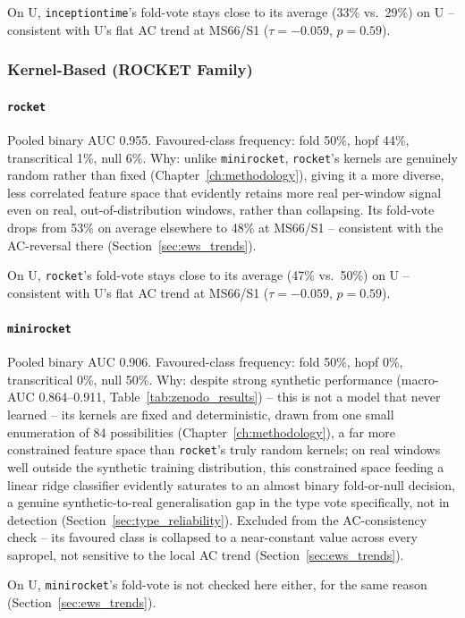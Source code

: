 On U, \texttt{inceptiontime}'s fold-vote stays close to its average (33\% vs.\ 29\%) on U -- consistent with U's flat AC trend at MS66/S1 ($\tau=-0.059$, $p=0.59$).

\subsubsection{Kernel-Based (ROCKET Family)}
\paragraph{\texttt{rocket}} Pooled binary AUC 0.955. Favoured-class frequency: fold 50\%, hopf 44\%, transcritical 1\%, null 6\%. Why: unlike \texttt{minirocket}, \texttt{rocket}'s kernels are genuinely random rather than fixed (Chapter~\ref{ch:methodology}), giving it a more diverse, less correlated feature space that evidently retains more real per-window signal even on real, out-of-distribution windows, rather than collapsing. Its fold-vote drops from 53\% on average elsewhere to 48\% at MS66/S1 -- consistent with the AC-reversal there (Section~\ref{sec:ews_trends}).

On U, \texttt{rocket}'s fold-vote stays close to its average (47\% vs.\ 50\%) on U -- consistent with U's flat AC trend at MS66/S1 ($\tau=-0.059$, $p=0.59$).

\paragraph{\texttt{minirocket}} Pooled binary AUC 0.906. Favoured-class frequency: fold 50\%, hopf 0\%, transcritical 0\%, null 50\%. Why: despite strong synthetic performance (macro-AUC 0.864--0.911, Table~\ref{tab:zenodo_results}) -- this is not a model that never learned -- its kernels are fixed and deterministic, drawn from one small enumeration of 84 possibilities (Chapter~\ref{ch:methodology}), a far more constrained feature space than \texttt{rocket}'s truly random kernels; on real windows well outside the synthetic training distribution, this constrained space feeding a linear ridge classifier evidently saturates to an almost binary fold-or-null decision, a genuine synthetic-to-real generalisation gap in the type vote specifically, not in detection (Section~\ref{sec:type_reliability}). Excluded from the AC-consistency check -- its favoured class is collapsed to a near-constant value across every sapropel, not sensitive to the local AC trend (Section~\ref{sec:ews_trends}).

On U, \texttt{minirocket}'s fold-vote is not checked here either, for the same reason (Section~\ref{sec:ews_trends}).

